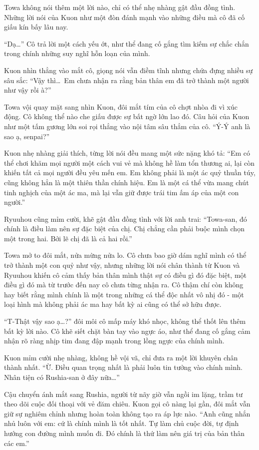 \documentclass[../main.tex]{subfiles}
\begin{document}
Towa không nói thêm một lời nào, chỉ có thể nhẹ nhàng gật đầu đồng tình. Những lời nói của Kuon như một đòn đánh mạnh vào những điều mà cô đã cố giấu kín bấy lâu nay.

``Dạ\dots'' Cô trả lời một cách yếu ớt, như thể đang cố gắng tìm kiếm sự chắc chắn trong chính những suy nghĩ hỗn loạn của mình.

Kuon nhìn thẳng vào mắt cô, giọng nói vẫn điềm tĩnh nhưng chứa đựng nhiều sự sâu sắc: ``Vậy thì\dots\ Em chưa nhận ra rằng bản thân em đã trở thành một người như vậy rồi à?''

Towa vội quay mặt sang nhìn Kuon, đôi mắt tím của cô chợt nhòa đi vì xúc động. Cô không thể nào che giấu được sự bất ngờ lớn lao đó. Câu hỏi của Kuon như một tấm gương lớn soi rọi thẳng vào nội tâm sâu thẳm của cô. ``Ý-Ý anh là sao ạ, senpai?''

Kuon nhẹ nhàng giải thích, từng lời nói đều mang một sức nặng khó tả: ``Em có thể chơi khăm mọi người một cách vui vẻ mà không hề làm tổn thương ai, lại còn khiến tất cả mọi người đều yêu mến em. Em không phải là một ác quỷ thuần túy, cũng không hẳn là một thiên thần chính hiệu. Em là một cá thể vừa mang chút tinh nghịch của một ác ma, mà lại vẫn giữ được trái tim ấm áp của một con người.''

Ryuuhou cũng mỉm cười, khẽ gật đầu đồng tình với lời anh trai: ``Towa-san, đó chính là điều làm nên sự đặc biệt của chị. Chị chẳng cần phải buộc mình chọn một trong hai. Bởi lẽ chị đã là cả hai rồi.''

Towa mở to đôi mắt, nửa mừng nửa lo. Cô chưa bao giờ dám nghĩ mình có thể trở thành một con quỷ như vậy, nhưng những lời nói chân thành từ Kuon và Ryuuhou khiến cô cảm thấy bản thân mình thật sự có điều gì đó đặc biệt, một điều gì đó mà từ trước đến nay cô chưa từng nhận ra. Cô thậm chí còn không hay biết rằng mình chính là một trong những cá thể độc nhất vô nhị đó - một loại hình mà không phải ác ma hay bất kỳ ai cũng có thể sở hữu được.

``T-Thật vậy sao ạ\dots?'' đôi môi cô mấp máy khó nhọc, không thể thốt lên thêm bất kỳ lời nào. Cô khẽ siết chặt bàn tay vào ngực áo, như thể đang cố gắng cảm nhận rõ ràng nhịp tim đang đập mạnh trong lồng ngực của chính mình.

Kuon mỉm cười nhẹ nhàng, không hề vội vã, chỉ đưa ra một lời khuyên chân thành nhất. ``Ừ. Điều quan trọng nhất là phải luôn tin tưởng vào chính mình. Nhân tiện có Rushia-san ở đây nữa\dots''

Cậu chuyển ánh mắt sang Rushia, người từ nãy giờ vẫn ngồi im lặng, trầm tư theo dõi cuộc đối thoại với vẻ đăm chiêu. Kuon gọi cô nàng lại gần, đôi mắt vẫn giữ sự nghiêm chỉnh nhưng hoàn toàn không tạo ra áp lực nào. ``Anh cũng nhắn nhủ luôn với em: cứ là chính mình là tốt nhất. Tự làm chủ cuộc đời, tự định hướng con đường mình muốn đi. Đó chính là thứ làm nên giá trị của bản thân các em.''
\end{document}
